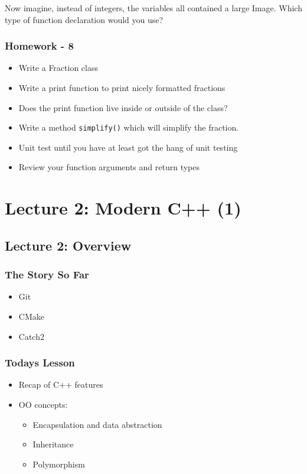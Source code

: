 Now imagine, instead of integers, the variables all contained a large
Image. Which type of function declaration would you use?

\subsubsection{Homework - 8}\label{homework---8}

\begin{itemize}
\itemsep1pt\parskip0pt
\item
  Write a Fraction class
\item
  Write a print function to print nicely formatted fractions
\item
  Does the print function live inside or outside of the class?
\item
  Write a method \texttt{simplify()} which will simplify the fraction.
\item
  Unit test until you have at least got the hang of unit testing
\item
  Review your function arguments and return types
\end{itemize}

\section{Lecture 2: Modern C++ (1)}\label{lecture-2-modern-c-1}

\subsection{Lecture 2: Overview}\label{lecture-2-overview}

\subsubsection{The Story So Far}\label{the-story-so-far}

\begin{itemize}
\itemsep1pt\parskip0pt
\item
  Git
\item
  CMake
\item
  Catch2
\end{itemize}

\subsubsection{Todays Lesson}\label{todays-lesson}

\begin{itemize}
\itemsep1pt\parskip0pt
\item
  Recap of C++ features
\item
  OO concepts:

  \begin{itemize}
  \itemsep1pt\parskip0pt
  \item
    Encapsulation and data abstraction
  \item
    Inheritance
  \item
    Polymorphism
  \end{itemize}
\end{itemize}

